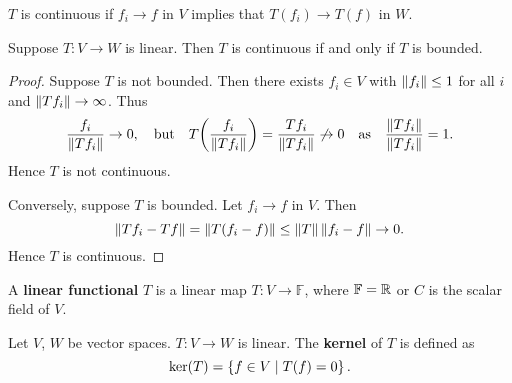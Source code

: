 \begin{definition}
    $T$ is continuous if $f_i\to f$ in $V$ implies that 
    $T(f_i)\to T(f)$ in $W$.
\end{definition} 

\begin{proposition}
    Suppose $T:V\to W$ is linear. Then $T$ is continuous if and 
    only if $T$ is bounded.
\end{proposition}
\begin{proof}
    Suppose $T$ is not bounded. Then there exists $f_i\in V$ with 
    $\left\lVert {f_i} \right\rVert \leq 1$ for all $i$ and $\left\lVert {Tf_i} \right\rVert\to\infty$. 
    Thus 
    \begin{equation*}
        \frac{f_i}{\norm{Tf_i}}\to 0, \quad \text{but}\quad 
        T\pth{\frac{f_i}{\norm{Tf_i}}} = \frac{Tf_i}{\norm{Tf_i}} \not\to 0 
        \quad \text{as}\quad \frac{\norm{Tf_i}}{\norm{Tf_i}} = 1. 
    \end{equation*}
    Hence $T$ is not continuous. 

    Conversely, suppose $T$ is bounded. Let $f_i\to f$ in $V$. 
    Then 
    \begin{equation*}
        \left\lVert {Tf_i-Tf} \right\rVert = \left\lVert {T(f_i-f)} \right\rVert \leq \left\lVert {T} \right\rVert\left\lVert {f_i-f} \right\rVert\to 0.
    \end{equation*}
    Hence $T$ is continuous.
\end{proof}

\begin{definition}
    A \textbf{linear functional} $T$ is a linear map $T:V\to\mathbb{F}$, 
    where $\mathbb{F} = \mathbb{R}$ or $C$ is the scalar field of $V$.
\end{definition} 

\begin{definition}
    Let $V$, $W$ be vector spaces. $T:V\to W$ is linear. 
    The \textbf{kernel} of $T$ is defined as 
    \begin{equation*}
        \ker(T) = \left\{ f\in V \;\middle\vert\; T(f)=0 \right\}.
    \end{equation*}
\end{definition}

